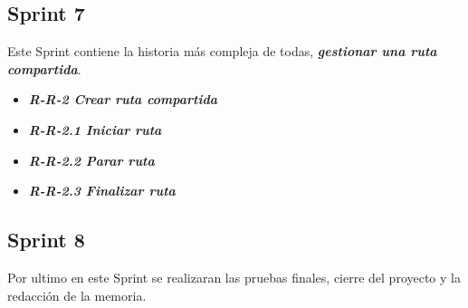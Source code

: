\subsection{Sprint 7}
Este Sprint contiene la historia más compleja de todas,\textbf{ \textit{gestionar una ruta compartida}}.

\begin{itemize}
\item \textbf{\textit{R-R-2 Crear ruta compartida}}
\item \textbf{\textit{R-R-2.1 Iniciar ruta}}
\item \textbf{\textit{R-R-2.2 Parar ruta}}
\item \textbf{\textit{R-R-2.3 Finalizar ruta}}
\end{itemize}

\subsection{Sprint 8}

Por ultimo en este Sprint se realizaran las pruebas finales, cierre del proyecto y la redacción de la memoria.

